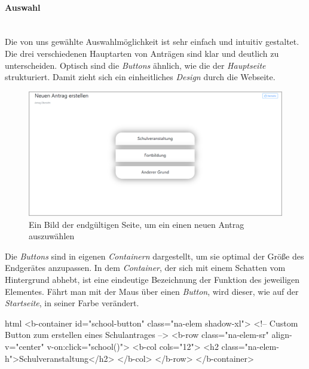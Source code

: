 \paragraph{Auswahl}
~\\
Die von uns gewählte Auswahlmöglichkeit ist sehr einfach und intuitiv gestaltet. Die drei verschiedenen Hauptarten von Anträgen sind klar und deutlich zu unterscheiden. Optisch sind die \textit{Buttons} ähnlich, wie die der \textit{Hauptseite} strukturiert. Damit zieht sich ein einheitliches \textit{Design} durch die Webseite.
\begin{figure}[H]
	\centering
	\includegraphics[width=1\linewidth]{images/ldehner_implementierung/neu}
	\caption[Neuen Antrag erstellen Seite]{Ein Bild der endgültigen Seite, um ein einen neuen Antrag auszuwählen}
	\label{fig:neuauswahl}
\end{figure}
Die \textit{Buttons} sind in eigenen \textit{Containern} dargestellt, um sie optimal der Größe des Endgerätes anzupassen. In dem \textit{Container}, der sich mit einem Schatten vom Hintergrund abhebt, ist eine eindeutige Bezeichnung der Funktion des jeweiligen Elementes. Fährt man mit der Maus über einen \textit{Button}, wird dieser, wie auf der \textit{Startseite}, in seiner Farbe verändert.
\begin{code}{html}
	<b-container id="school-button" class="na-elem shadow-xl">
	<!-- Custom Button zum erstellen eines Schulantrages -->
	<b-row
	  class="na-elem-sr"
	  align-v="center"
	  v-on:click="school()">
	  <b-col cols="12">
		<h2 class="na-elem-h">Schulveranstaltung</h2>
	  </b-col>
	</b-row>
  </b-container>	
\end{code}
	\label{list:htmlselect}

